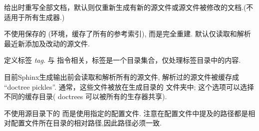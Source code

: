 \documentclass[letterpaper,10pt,english]{sphinxmanual}
\begin{document}

\begin{fulllineitems}
\label{invocation:cmdoption-sphinx-build-a}
给出时重写全部文档，默认则仅重新生成有新的源文件或源文件被修改的文档.(不适用于所有生成器.)

\end{fulllineitems}


\begin{fulllineitems}
\label{invocation:cmdoption-sphinx-build-E}
不使用保存的 {\hyperref[glossary:term\string-environment]{}} (环境，缓存了所有的参考索引), 而是完全重建.
默认仅读取和解析最近新添加及改动的源文件.

\end{fulllineitems}


\begin{fulllineitems}
\label{invocation:cmdoption-sphinx-build-t}
定义标签 \emph{tag}.  与 {\hyperref[markup/misc:directive\string-only]{}} 指令相关，标签是一个目录集合，仅处理标签目录中的内容.


\end{fulllineitems}


\begin{fulllineitems}
\label{invocation:cmdoption-sphinx-build-d}
目前Sphinx生成输出前会读取和解析所有的源文件,
解析过的源文件被缓存成 ``doctree pickles''.
通常，这些文件被放在生成目录的  文件夹中;
这个选项可以选择不同的缓存目录( doctrees 可以被所有的生存器共享).

\end{fulllineitems}


\begin{fulllineitems}
\label{invocation:cmdoption-sphinx-build-c}
不使用源目录下的  而是使用指定的配置文件.
注意在配置文件中提及的路径都是相对配置文件所在目录的相对路径,因此路径必须一致.


\end{fulllineitems}
\end{document}
